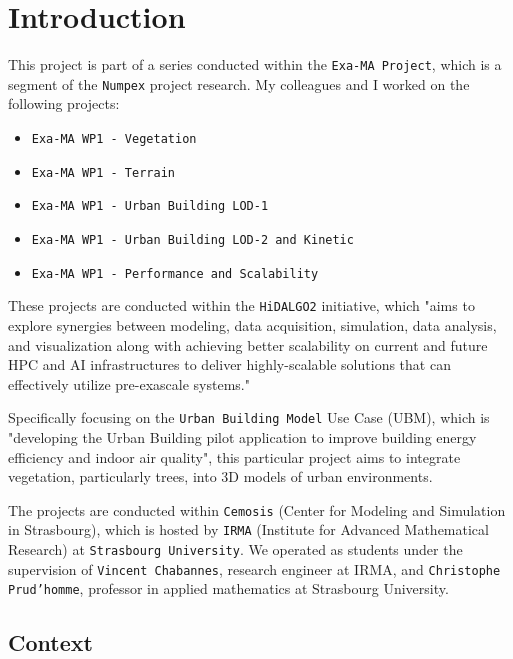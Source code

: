 \documentclass[12pt]{article}
\begin{document}
\tableofcontents

\newpage

\section{Introduction}

This project is part of a series conducted within the \texttt{Exa-MA Project}\cite{exaMA},
 which is a segment of the \texttt{Numpex} project research\cite{numpex}. 
 My colleagues and I worked on the following projects:
\begin{itemize}
\item \texttt{Exa-MA WP1 - Vegetation}
\item \texttt{Exa-MA WP1 - Terrain}
\item \texttt{Exa-MA WP1 - Urban Building LOD-1}
\item \texttt{Exa-MA WP1 - Urban Building LOD-2 and Kinetic}
\item \texttt{Exa-MA WP1 - Performance and Scalability}
\end{itemize}

These projects are conducted within the \texttt{HiDALGO2}\cite{hidalgo2} initiative,
 which "aims to explore synergies between modeling, data acquisition, simulation,
  data analysis, and visualization along with achieving better scalability on 
  current and future HPC and AI infrastructures to deliver highly-scalable solutions
   that can effectively utilize pre-exascale systems."\cite{hidalgo2-about}

Specifically focusing on the \texttt{Urban Building Model}\cite{hidalgo2-ubm} 
Use Case (UBM), which is "developing the Urban Building pilot application to improve
 building energy efficiency and indoor air quality"\cite{hidalgo2-ubm}, this particular
  project aims to integrate vegetation, particularly trees, into 3D models of urban
   environments.

The projects are conducted within \texttt{Cemosis}\cite{cemosis} (Center for Modeling 
and Simulation in Strasbourg), which is hosted by \texttt{IRMA}\cite{irma} 
(Institute for Advanced Mathematical Research) at \texttt{Strasbourg University}.
 We operated as students under the supervision of \texttt{Vincent Chabannes}\cite{chabannes},
  research engineer at IRMA, and \texttt{Christophe Prud'homme}\cite{prudhomme}, 
professor in applied mathematics at Strasbourg University.

\subsection{Context}
\end{document}
